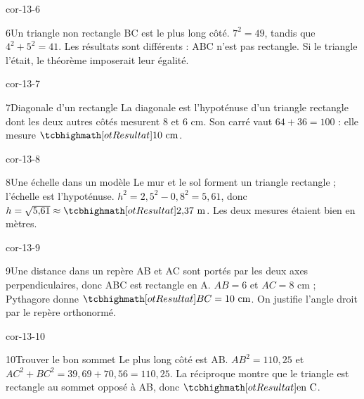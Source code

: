 \begin{blocLivre}{cor-13-6}\begin{corrige}{6}{Un triangle non rectangle}
BC est le plus long côté. $7^2=49$, tandis que $4^2+5^2=41$. Les résultats sont différents : ABC n’est pas rectangle. Si le triangle l’était, le théorème imposerait leur égalité.
\label{fig-cor-13-6}
\end{corrige}\end{blocLivre}
\begin{blocLivre}{cor-13-7}\begin{corrige}{7}{Diagonale d’un rectangle}
La diagonale est l’hypoténuse d’un triangle rectangle dont les deux autres côtés mesurent 8 et 6 cm. Son carré vaut $64+36=100$ : elle mesure $\res{10\ \mathrm{cm}}$.
\label{fig-cor-13-7}
\end{corrige}\end{blocLivre}
\begin{blocLivre}{cor-13-8}\begin{corrige}{8}{Une échelle dans un modèle}
Le mur et le sol forment un triangle rectangle ; l’échelle est l’hypoténuse. $h^2=2{,}5^2-0{,}8^2=5{,}61$, donc $h=\sqrt{5{,}61}\approx\res{2{,}37\ \mathrm m}$. Les deux mesures étaient bien en mètres.
\label{fig-cor-13-8}
\end{corrige}\end{blocLivre}
\begin{blocLivre}{cor-13-9}\begin{corrige}{9}{Une distance dans un repère}
AB et AC sont portés par les deux axes perpendiculaires, donc ABC est rectangle en A. $AB=6$ et $AC=8$ cm ; Pythagore donne $\res{BC=10\ \mathrm{cm}}$. On justifie l’angle droit par le repère orthonormé.
\label{fig-cor-13-9}
\end{corrige}\end{blocLivre}
\begin{blocLivre}{cor-13-10}\begin{corrige}{10}{Trouver le bon sommet}
Le plus long côté est AB. $AB^2=110{,}25$ et $AC^2+BC^2=39{,}69+70{,}56=110{,}25$. La réciproque montre que le triangle est rectangle au sommet opposé à AB, donc $\res{\text{en C}}$.
\label{fig-cor-13-10}
\end{corrige}\end{blocLivre}
